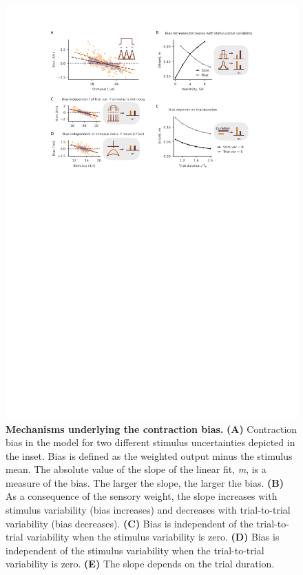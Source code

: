 \documentclass[10pt,a4paper]{article}
\begin{document}
\begin{figure}[t!]
	\centering
    \includegraphics{../results/figures/final/Fig_5.pdf}
\caption{\footnotesize{\bf Mechanisms underlying the contraction bias.\newline} 
{\bf (A)} Contraction bias in the model for two different stimulus uncertainties depicted in the inset. Bias is defined as the weighted output minus the stimulus mean. The absolute value of the slope of the linear fit, \textit{m}, is a measure of the bias. The larger the slope, the larger the bias.
{\bf (B)}  As a consequence of the sensory weight, the slope increases with stimulus variability (bias increases) and decreases with trial-to-trial variability (bias decreases).
{\bf (C)} Bias is independent of the trial-to-trial variability when the stimulus variability is zero.
{\bf (D)} Bias is independent of the stimulus variability when the trial-to-trial variability is zero.
{\bf (E)} The slope depends on the trial duration.
}
\label{fig:Fig_5}
\end{figure}
%
\end{document}
